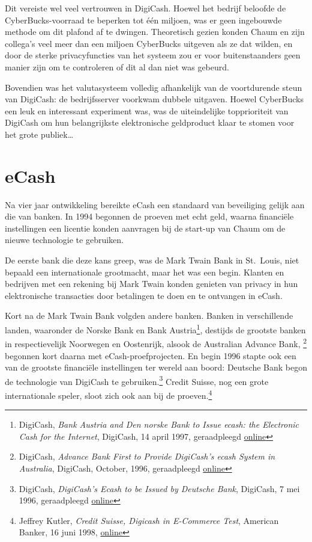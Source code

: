 \documentclass[
  a5paper,
  smalldemyvopaper,11pt,twoside,onecolumn,openright,extrafontsizes,
hidelinks]{memoir}
\begin{document}
Dit vereiste wel veel vertrouwen in DigiCash. Hoewel het bedrijf
beloofde de CyberBucks-voorraad te beperken tot één miljoen, was er geen
ingebouwde methode om dit plafond af te dwingen. Theoretisch gezien
konden Chaum en zijn collega's veel meer dan een miljoen CyberBucks
uitgeven als ze dat wilden, en door de sterke privacyfuncties van het
systeem zou er voor buitenstaanders geen manier zijn om te controleren
of dit al dan niet was gebeurd.

Bovendien was het valutasysteem volledig afhankelijk van de voortdurende
steun van DigiCash: de bedrijfsserver voorkwam dubbele uitgaven. Hoewel
CyberBucks een leuk en interessant experiment was, was de uiteindelijke
topprioriteit van DigiCash om hun belangrijkste elektronische
geldproduct klaar te stomen voor het grote publiek\ldots{}

\section{eCash}\label{ecash}

Na vier jaar ontwikkeling bereikte eCash een standaard van beveiliging
gelijk aan die van banken. In 1994 begonnen de proeven met echt geld,
waarna financiële instellingen een licentie konden aanvragen bij de
start-up van Chaum om de nieuwe technologie te gebruiken.

De eerste bank die deze kans greep, was de Mark Twain Bank in St.~Louis,
niet bepaald een internationale grootmacht, maar het was een begin.
Klanten en bedrijven met een rekening bij Mark Twain konden genieten van
privacy in hun elektronische transacties door betalingen te doen en te
ontvangen in eCash.

Kort na de Mark Twain Bank volgden andere banken. Banken in
verschillende landen, waaronder de Norske Bank en Bank
Austria\footnote{DigiCash, \emph{Bank Austria and Den norske Bank to
  Issue ecash: the Electronic Cash for the Internet}, DigiCash, 14 april
  1997, geraadpleegd
  \href{https://web.archive.org/web/19970605025912/http://www.digicash.com:80/publish/ec_pres8.html}{online}},
destijds de grootste banken in respectievelijk Noorwegen en Oostenrijk,
alsook de Australian Advance Bank, \footnote{DigiCash, \emph{Advance
  Bank First to Provide DigiCash's ecash System in Australia}, DigiCash,
  October, 1996, geraadpleegd
  \href{https://web.archive.org/web/19961102121407/https://www.digicash.com/publish/ec_pres6.html}{online}}
begonnen kort daarna met eCash-proefprojecten. En begin 1996 stapte ook
een van de grootste financiële instellingen ter wereld aan boord:
Deutsche Bank begon de technologie van DigiCash te gebruiken.\footnote{DigiCash,
  \emph{DigiCash's Ecash to be Issued by Deutsche Bank}, DigiCash, 7 mei
  1996, geraadpleegd
  \href{https://web.archive.org/web/19961102121355/https://www.digicash.com/publish/ec_pres5.html}{online}}
Credit Suisse, nog een grote internationale speler, sloot zich ook aan
bij de proeven.\footnote{Jeffrey Kutler, \emph{Credit Suisse, Digicash
  in E-Commerce Test}, American Banker, 16 juni 1998,
  \href{https://www.americanbanker.com/news/credit-suisse-digicash-in-e-commerce-test}{online}}
\end{document}
